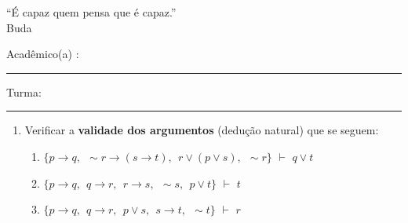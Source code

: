 \documentclass[12pt, a4paper,final]{article}
\begin{document}

\begin{flushright}
``É capaz quem pensa que é capaz.''\\{\footnotesize  Buda}
\end{flushright}


\vskip 0.5cm Acad\^emico(a) : \rule{10cm}{0.4pt} Turma:  \rule{1cm}{0.4pt}
\noindent
\begin{enumerate}

\item Verificar a \textbf{validade dos argumentos} (dedu\c c\~ao natural) que se seguem: %

\begin{enumerate}





\item $\{ p \rightarrow q, \:\: \sim r \rightarrow (s \rightarrow t),\:\: r \vee (p \vee s), \:\: \sim r \}$ {\bf $\vdash $} $q \vee t$


\item $\{ p \rightarrow q, \:\: q \rightarrow r, \:\: 
r \rightarrow s, \:\: \sim s, \:\: p \vee t \}$ {\bf $\vdash $} $t$



\item $\{ p \rightarrow q, \:\: q \rightarrow r, \:\: p \vee s, \:\: s \rightarrow t, \:\: \sim t \}$ {\bf $\vdash $} $r$





\end{enumerate}
\end{enumerate}
\end{document}
